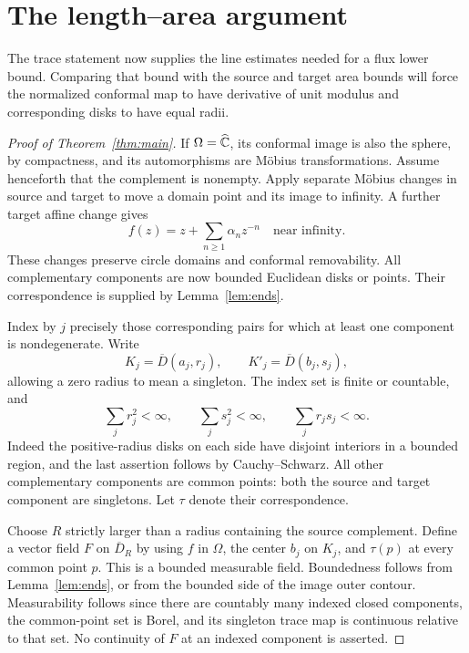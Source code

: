 \section{The length--area argument}\label{sec:rigidity}

The trace statement now supplies the line estimates needed for a flux
lower bound.  Comparing that bound with the source and target area
bounds will force the normalized conformal map to have derivative of
unit modulus and corresponding disks to have equal radii.

\begin{proof}[Proof of Theorem~\ref{thm:main}]
If $\Omega=\widehat{\mathbb C}$, its conformal image is also the sphere, by
compactness, and its automorphisms are M\"obius transformations.
Assume henceforth that the complement is nonempty.  Apply separate
M\"obius changes in source and target to move a domain point and its
image to infinity.  A further target affine change gives
\begin{equation}\label{eq:rigidity-normalization}
 f(z)=z+\sum_{n\ge1}\alpha_nz^{-n}
 \quad\text{near infinity}.
\end{equation}
These changes preserve circle domains and conformal removability.
All complementary components are now bounded Euclidean disks or
points.  Their correspondence is supplied by Lemma~\ref{lem:ends}.

Index by $j$ precisely those corresponding pairs for which at least
one component is nondegenerate.  Write
\[
 K_j=\overline D(a_j,r_j),\qquad
 K'_j=\overline D(b_j,s_j),
\]
allowing a zero radius to mean a singleton.  The index set is finite
or countable, and
\begin{equation}\label{eq:radius-summability}
 \sum_jr_j^2<\infty,\qquad \sum_js_j^2<\infty,\qquad
 \sum_jr_js_j<\infty.
\end{equation}
Indeed the positive-radius disks on each side have disjoint interiors
in a bounded region, and the last assertion follows by
Cauchy--Schwarz.  All other complementary components are common
points: both the source and target component are singletons.
Let $\tau$ denote their correspondence.

Choose $R$ strictly larger than a radius containing the source
complement.  Define a vector field $F$ on $\overline D_R$ by using
$f$ in $\Omega$, the center $b_j$ on $K_j$, and $\tau(p)$ at every
common point $p$.  This is a bounded measurable field.  Boundedness
follows from Lemma~\ref{lem:ends}, or from the bounded side of the
image outer contour.  Measurability follows since there are
countably many indexed closed components, the common-point set is
Borel, and its singleton trace map is continuous relative to that
set.  No continuity of $F$ at an indexed component is asserted.


\end{proof}
